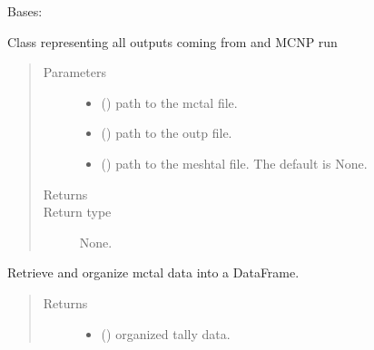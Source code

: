 \documentclass[letterpaper,10pt,english]{sphinxmanual}
\begin{document}
\begin{fulllineitems}
\label{\detokenize{api/postprocessing:output.MCNPoutput}}
Bases: 

Class representing all outputs coming from and MCNP run
\begin{quote}\begin{description}
\item[{Parameters}] \leavevmode\begin{itemize}
\item {} 
 () \textendash{} path to the mctal file.

\item {} 
 () \textendash{} path to the outp file.

\item {} 
 (\sphinxstyleliteralemphasis{\sphinxupquote{, }}) \textendash{} path to the meshtal file. The default is None.

\end{itemize}

\item[{Returns}] \leavevmode


\item[{Return type}] \leavevmode
None.

\end{description}\end{quote}

\begin{fulllineitems}
\label{\detokenize{api/postprocessing:output.MCNPoutput.organize_mctal}}
Retrieve and organize mctal data into a DataFrame.
\begin{quote}\begin{description}
\item[{Returns}] \leavevmode
\begin{itemize}
\item {} 
 () \textendash{} organized tally data.


\end{itemize}
\end{description}
\end{quote}
\end{fulllineitems}
\end{fulllineitems}
\end{document}
